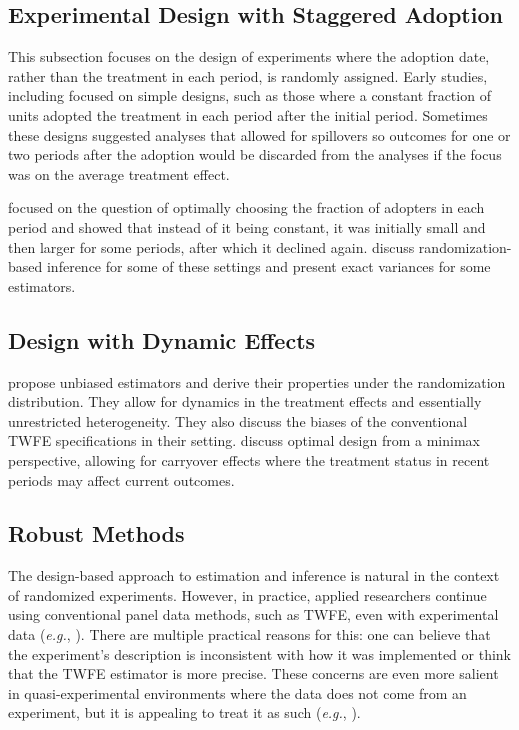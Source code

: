 \documentclass[letterpaper,12pt,leqno]{article}
\begin{document}
\subsection{Experimental Design with Staggered Adoption}

This subsection focuses on the design of experiments where the adoption date, rather than the treatment in each period,  is randomly assigned. 
Early studies, including
 \citep*{hemming2015stepped,
hussey2007design,
barker2016stepped} focused on simple designs, such as those where a constant fraction of units adopted the treatment in each period after the initial period. Sometimes these designs suggested analyses that allowed for spillovers so outcomes for one or two periods after the adoption would be discarded from the analyses if the focus was on the average treatment effect.

 \citep{xiong2019optimal} focused on the question of optimally choosing the fraction of adopters in each period and showed that instead of it being constant, it was initially small and then larger for some periods, after which it declined again.  \citep{bajari2023experimental} discuss randomization-based inference for some of these settings and present exact variances for some estimators.

 
 \subsection{Design with Dynamic Effects}


 \citep{bojinov2021panel} propose unbiased estimators and derive their properties under the randomization distribution. They allow for dynamics in the treatment effects and essentially unrestricted heterogeneity. They also discuss the biases of the conventional TWFE specifications in their setting.  \citep{bojinov2022design} discuss optimal design from a minimax perspective, allowing for carryover effects where the treatment status in recent periods may affect current outcomes.

\subsection{Robust Methods}

The design-based approach to estimation and inference is natural in the context of randomized experiments. However, in practice, applied researchers continue using conventional panel data methods, such as TWFE, even with experimental data (\textit{e.g.}, \citep{broda2014economic,colonnelli2022corruption}). There are multiple practical reasons for this: one can believe that the experiment's description is inconsistent with how it was implemented or think that the TWFE estimator is more precise. These concerns are even more salient in quasi-experimental environments where the data does not come from an experiment, but it is appealing to treat it as such (\textit{e.g.}, \citep{borusyak2022non}). 
\end{document}
